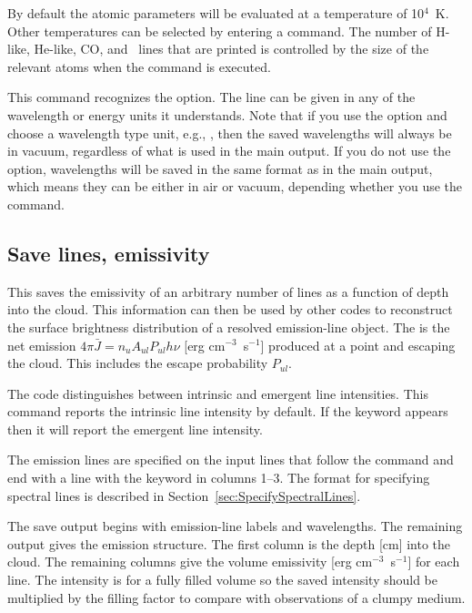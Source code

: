 By default the atomic parameters will be evaluated at a temperature of
10$^4$~K.  Other temperatures can be selected by entering a
 command.
The number of H-like, He-like, CO,
and \htwo\ lines that are printed is controlled by the size of the
relevant atoms when the  command is executed.

This command recognizes the  option.
The line
can be given in any of the wavelength or energy units
it understands.
Note that if you use the  option
and choose a wavelength type unit, e.g., , then the saved
wavelengths will always be in vacuum, regardless of what is used in the main
output. If you do not use the  option, wavelengths will be
saved in the same format as in the main output, which means they can be either
in air or vacuum, depending whether you use the 
command.

\subsection{Save lines, emissivity}

This saves the emissivity of an arbitrary number of lines as a function
of depth into the cloud.  This information can then be used by other codes
to reconstruct the surface brightness distribution of a resolved
emission-line object.  The 
is the net emission
$4\pi \bar J = n_u A_{ul} P_{ul} h\nu $
[erg cm$^{-3}$~s$^{-1}$] produced at a point and escaping the cloud.
This includes the escape probability $P_{ul}$.

The code distinguishes between intrinsic and emergent
line intensities.
This command reports the intrinsic line intensity by default.
If the keyword  appears then it will
report the emergent line intensity.

The emission lines are specified on the input lines that follow the
command and end with a line with the keyword  in columns 1--3.
The format for specifying spectral lines is described in Section~\ref{sec:SpecifySpectralLines}.

The save output begins with emission-line labels and wavelengths.  The
remaining output gives the emission structure.  The first column is the
depth [cm] into the cloud.  The remaining columns give the volume emissivity
[erg cm$^{-3}$~s$^{-1}$] for each line.  The intensity is for a fully filled volume
so the saved intensity should be multiplied by the filling factor to
compare with observations of a clumpy medium.

